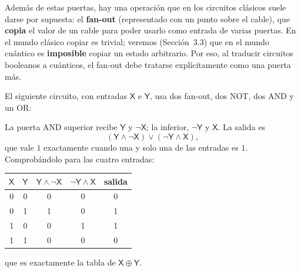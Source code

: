 \documentclass[11pt, a4paper, twoside, openright]{report}
\begin{document}
\noindent Además de estas puertas, hay una operación que en los circuitos clásicos suele darse por supuesta: el \textbf{fan-out} (representado con un punto sobre el cable), que \textbf{copia} el valor de un cable para poder usarlo como entrada de varias puertas. En el mundo clásico copiar es trivial; veremos (Sección~3.3) que en el mundo cuántico es \textbf{imposible} copiar un estado arbitrario. Por eso, al traducir circuitos booleanos a cuánticos, el fan-out debe tratarse explícitamente como una puerta más.

\begin{tcolorbox}[colback=cyan!5!white,colframe=cyan!75!black,title=\textbf{Ejemplo: Un circuito que calcula el XOR}]
El siguiente circuito, con entradas $\mathsf{X}$ e $\mathsf{Y}$, usa dos fan-out, dos NOT, dos AND y un OR:
\begin{center}
\end{center}
La puerta AND superior recibe $\mathsf{Y}$ y $\neg\mathsf{X}$; la inferior, $\neg\mathsf{Y}$ y $\mathsf{X}$. La salida es
\[ (\mathsf{Y}\wedge\neg\mathsf{X}) \vee (\neg\mathsf{Y}\wedge\mathsf{X}), \]
que vale $1$ exactamente cuando una y solo una de las entradas es $1$. Comprobándolo para las cuatro entradas:
\begin{center}
\begin{tabular}{cc|cc|c}
$\mathsf{X}$ & $\mathsf{Y}$ & $\mathsf{Y}\wedge\neg\mathsf{X}$ & $\neg\mathsf{Y}\wedge\mathsf{X}$ & salida \\ \hline
0 & 0 & 0 & 0 & 0 \\
0 & 1 & 1 & 0 & 1 \\
1 & 0 & 0 & 1 & 1 \\
1 & 1 & 0 & 0 & 0
\end{tabular}
\end{center}
que es exactamente la tabla de $\mathsf{X}\oplus\mathsf{Y}$.
\end{tcolorbox}
\end{document}
